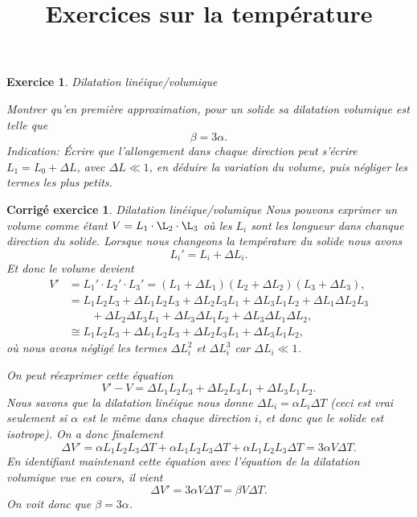\documentclass[a4paper,12pt]{article}
\title{Exercices sur la température}
\date{}
\newtheorem{exercice}{Exercice}
\newtheorem{corrige}{Corrig\'e exercice}
\begin{document}
\maketitle

\begin{exercice}{Dilatation linéique/volumique}

Montrer qu’en première approximation, pour un solide sa dilatation volumique est telle que 
\begin{equation}
\beta=3\alpha.
\end{equation}
Indication: Écrire que l'allongement dans chaque direction peut s'écrire $L_1=L_0+\Delta L$, avec $\Delta L\ll 1$,
en déduire la variation
du volume, puis négliger les termes les plus petits.
\end{exercice}

\begin{corrige}{Dilatation linéique/volumique}
Nous pouvons exprimer un volume comme étant $V=L_1\cdot\L_2\cdot\L_3$ où les $L_i$ sont les longueur
dans chanque direction du solide. Lorsque nous changeons la température du solide nous avons 
\begin{equation}
L_i'=L_i+\Delta L_i.
\end{equation}
Et donc le volume devient 
\begin{align}
V'&=L_1'\cdot L_2'\cdot L_3'=(L_1+\Delta L_1)(L_2+\Delta L_2)(L_3+\Delta L_3),\nonumber\\
  &=L_1L_2L_3+\Delta L_1 L_2L_3+\Delta L_2 L_3L_1+\Delta L_3 L_1L_2+\Delta L_1 \Delta L_2L_3\nonumber\\
  &\quad\quad+\Delta L_2 \Delta L_3L_1+\Delta L_3 \Delta L_1L_2+\Delta L_3 \Delta L_1 \Delta L_2,\nonumber\\
  &\cong L_1L_2L_3+\Delta L_1 L_2L_3+\Delta L_2 L_3L_1+\Delta L_3 L_1L_2,
\end{align}
où nous avons négligé les termes $\Delta L_i^2$ et $\Delta L_i^3$ car $\Delta L_i\ll 1$.

On peut réexprimer cette équation 
\begin{equation}
V'-V=\Delta L_1 L_2L_3+\Delta L_2 L_3L_1+\Delta L_3 L_1L_2.
\end{equation}
Nous savons que la dilatation linéique nous donne $\Delta L_i=\alpha L_i\Delta T$ (ceci est vrai seulement si $\alpha$ est le même dans chaque direction $i$, et donc que le solide est isotrope). On a donc finalement
\begin{equation}
\Delta V'=\alpha L_1 L_2L_3\Delta T+\alpha L_1 L_2L_3\Delta T+\alpha L_1 L_2L_3\Delta T=3\alpha V\Delta T.
\end{equation}
En identifiant maintenant cette équation avec l'équation de la dilatation volumique vue en cours, il vient
\begin{equation}
\Delta V'=3\alpha V\Delta T=\beta V\Delta T.
\end{equation}
On voit donc que $\beta=3\alpha$.

\end{corrige}
\end{document}
